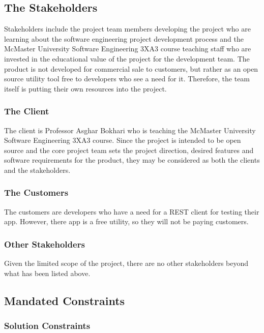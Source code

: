 \documentclass[12pt, titlepage]{article}
\begin{document}
\subsection{The Stakeholders}
Stakeholders include the project team members developing the project who are learning about the software engineering project development process and the McMaster University Software Engineering 3XA3 course teaching staff who are invested in the educational value of the project for the development team. The product is not developed for commercial sale to customers, but rather as an open source utility tool free to developers who see a need for it. Therefore, the team itself is putting their own resources into the project.

\subsubsection{The Client}
The client is Professor Asghar Bokhari who is teaching the McMaster University Software Engineering 3XA3 course. Since the project is intended to be open source and the core project team sets the project direction, desired features and software requirements for the product, they may be considered as both the clients and the stakeholders.

\subsubsection{The Customers}
The customers are developers who have a need for a REST client for testing their app. However, there app is a free utility, so they will not be paying customers.

\subsubsection{Other Stakeholders}
Given the limited scope of the project, there are no other stakeholders beyond what has been listed above.

\subsection{Mandated Constraints}
\subsubsection{Solution Constraints}
\end{document}
